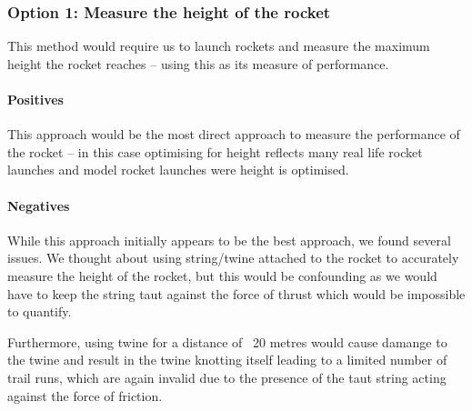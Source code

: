 \documentclass[14pt]{article}
\begin{document}
\subsubsection{Option 1: Measure the height of the rocket}

This method would require us to launch rockets and measure the maximum height the rocket reaches -- using this as its measure of performance.
\paragraph{Positives}

This approach would be the most direct approach to measure the performance of the rocket --  in this case optimising for height reflects many real life rocket launches and model rocket launches were height is optimised.
\paragraph{Negatives}

While this approach initially appears to be the best approach, we found several issues. 
We thought about using string/twine attached to the rocket to accurately measure the height of the rocket, but this would be confounding as we would have to keep the string taut against the force of thrust which would be impossible to quantify. 

Furthermore, using twine for a distance of ~20 metres would cause damange to the twine and result in the twine knotting itself leading to a limited number of trail runs, which are again invalid due to the presence of the taut string acting against the force of friction.
\end{document}
